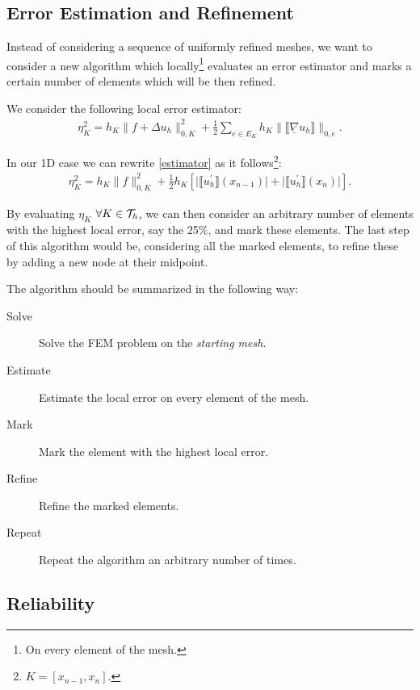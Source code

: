\subsection{Error Estimation and Refinement}

Instead of considering a sequence of uniformly refined meshes, we want to consider a new algorithm which locally\footnote{On every element of the mesh.} evaluates an error estimator and marks a certain number of elements which will be then refined.

We consider the following local error estimator:
\begin{gather} \label{estimator}
	\eta_K^2 = h_K \lVert f + \Delta u_h \rVert_{0, K}^2 + \frac{1}{2} \sum_{e \in E_K} h_K \lVert \llbracket \underline{\nabla} u_h \rrbracket \rVert_{0, e}.
\end{gather}

In our 1D case we can rewrite \ref{estimator} as it follows\footnote{$K = [x_{n - 1}, x_n]$.}:
\begin{gather}
	\eta_K^2 = h_K \lVert f \rVert_{0, K}^2 + \frac{1}{2} h_K \left[ \lvert \llbracket u_h^\prime \rrbracket (x_{n - 1}) \rvert + \lvert \llbracket u_h^\prime \rrbracket (x_n) \rvert \right].
\end{gather}

By evaluating $\eta_K$ $\forall K \in \mathcal{T}_h$, we can then consider an arbitrary number of elements with the highest local error, say the 25\%, and mark these elements. The last step of this algorithm would be, considering all the marked elements, to refine these by adding a new node at their midpoint.

The algorithm should be summarized in the following way:
\begin{description}
	\item[Solve] Solve the FEM problem on the \textit{starting mesh}.
	\item[Estimate] Estimate the local error on every element of the mesh.
	\item[Mark] Mark the element with the highest local error.
	\item[Refine] Refine the marked elements.  
	\item[Repeat] Repeat the algorithm an arbitrary number of times. 
\end{description}

\newpage
\subsection{Reliability}

